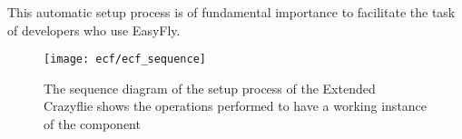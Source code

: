 This automatic setup process is of fundamental importance to facilitate the task of developers who use EasyFly.

\begin{figure}[tb]
    \centering
    \texttt{[image: ecf/ecf\_sequence]} 
    \caption[ECF initialization sequence diagram]{The sequence diagram of the setup process of the Extended Crazyflie shows the operations performed to have a working instance of the component}\label{fig:ecf_sequence}
\end{figure}






